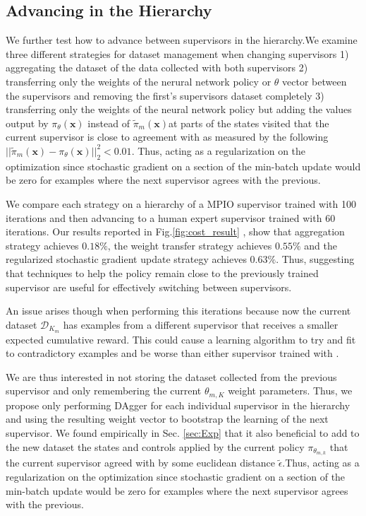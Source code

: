 \documentclass[10pt, conference]{ieeeconf}      %
\newcommand{\bx}{\mathbf{x}}
\begin{document}
\subsection{Advancing in the Hierarchy}
We further test how to advance between supervisors in the hierarchy.We examine three different strategies for dataset management when changing supervisors 1) aggregating the dataset of the data collected with both supervisors 2) transferring only the weights of the nerural network policy or $\theta$ vector between the supervisors and removing the first's supervisors dataset completely 3) transferring only the weights of the neural network policy but adding the values output by $\pi_\theta(\bx)$  instead of $\tilde{\pi}_m(\bx)$at parts of the states visited that the current supervisor is close to agreement with as measured by the following $||\tilde{\pi}_m(\bx) - \pi_\theta(\bx)||^2_2 < 0.01$. Thus, acting as a regularization on the optimization since stochastic gradient on a section of the min-batch update would be zero for examples where the next supervisor agrees with the previous. 


We compare each strategy on a hierarchy of a MPIO supervisor trained with 100 iterations and then advancing to a human expert supervisor trained with 60 iterations.  Our results reported in Fig.\ref{fig:cost_result} , show that aggregation strategy achieves $0.18\%$, the weight transfer strategy achieves $0.55\%$ and the regularized stochastic gradient update strategy achieves $0.63\%$. Thus, suggesting that techniques to help the policy remain close to the previously trained supervisor are useful for effectively switching between supervisors.   



An issue arises though when performing this iterations because now the current dataset $\mathcal{D}_{K_m}$ has examples from a different supervisor that receives a smaller expected cumulative reward. This could cause a learning algorithm to try and fit to contradictory examples  and be worse than either supervisor trained with \cite{scholkopf2002learning}.

We are thus interested in not storing the dataset collected from the previous supervisor and only remembering the current $\theta_{m,K}$ weight parameters. Thus, we propose only performing DAgger for each individual supervisor in the hierarchy and using the resulting weight vector to bootstrap the learning of the next supervisor. We found empirically in Sec. \ref{sec:Exp} that it also beneficial to add to the new dataset the states and controls applied by the current policy $\pi_{\theta_{m,k}}$ that the current supervisor agreed with by some euclidean distance $\tilde{\epsilon}$.Thus, acting as a regularization on the optimization since stochastic gradient on a section of the min-batch update would be zero for examples where the next supervisor agrees with the previous. 
\end{document}
